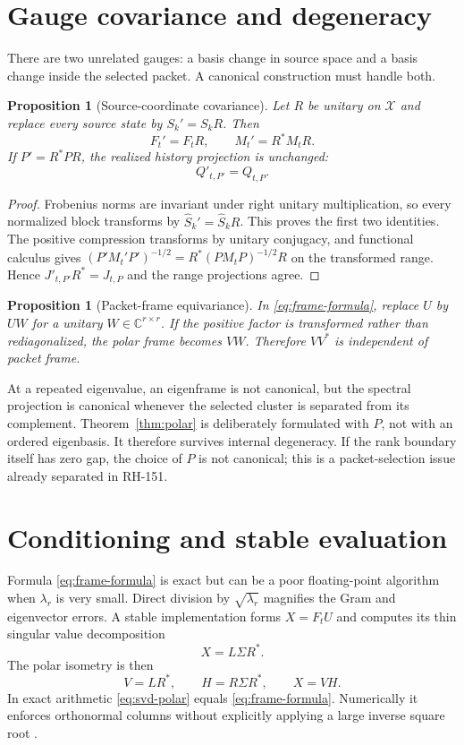 \documentclass[12pt]{article}
\newtheorem{proposition}[theorem]{Proposition}
\theoremstyle{definition}
\theoremstyle{remark}
\newcommand{\cX}{\mathcal X}
\begin{document}
\section{Gauge covariance and degeneracy}

There are two unrelated gauges: a basis change in source space and a basis
change inside the selected packet.  A canonical construction must handle
both.

\begin{proposition}[Source-coordinate covariance]\label{prop:source-gauge}
Let $R$ be unitary on $\cX$ and replace every source state by
$S_k'=S_kR$.  Then
\[
 F_t'=F_tR,
 \qquad M_t'=R^*M_tR.
\]
If $P'=R^*PR$, the realized history projection is unchanged:
\[
 Q'_{t,P'}=Q_{t,P}.
\]
\end{proposition}

\begin{proof}
Frobenius norms are invariant under right unitary multiplication, so every
normalized block transforms by $\widehat S_k'=\widehat S_kR$.  This proves
the first two identities.  The positive compression transforms by unitary
conjugacy, and functional calculus gives
$(P'M_t'P')^{-1/2}=R^*(PM_tP)^{-1/2}R$ on the transformed range.  Hence
$J'_{t,P'}R^*=J_{t,P}$ and the range projections agree.
\end{proof}

\begin{proposition}[Packet-frame equivariance]\label{prop:packet-gauge}
In \eqref{eq:frame-formula}, replace $U$ by $UW$ for a unitary
$W\in\mathbb C^{r\times r}$.  If the positive factor is transformed rather
than rediagonalized, the polar frame becomes $VW$.  Therefore $VV^*$ is
independent of packet frame.
\end{proposition}

At a repeated eigenvalue, an eigenframe is not canonical, but the spectral
projection is canonical whenever the selected cluster is separated from its
complement.  Theorem~\ref{thm:polar} is deliberately formulated with $P$,
not with an ordered eigenbasis.  It therefore survives internal degeneracy.
If the rank boundary itself has zero gap, the choice of $P$ is not canonical;
this is a packet-selection issue already separated in RH-151.

\section{Conditioning and stable evaluation}

Formula \eqref{eq:frame-formula} is exact but can be a poor floating-point
algorithm when $\lambda_r$ is very small.  Direct division by
$\sqrt{\lambda_r}$ magnifies the Gram and eigenvector errors.  A stable
implementation forms $X=F_tU$ and computes its thin singular value
decomposition
\[
 X=L\Sigma R^*.
\]
The polar isometry is then
\begin{equation}\label{eq:svd-polar}
 V=LR^*,
 \qquad H=R\Sigma R^*,
 \qquad X=VH.
\end{equation}
In exact arithmetic \eqref{eq:svd-polar} equals
\eqref{eq:frame-formula}.  Numerically it enforces orthonormal columns without
explicitly applying a large inverse square root \citep{Higham2008}.
\end{document}

